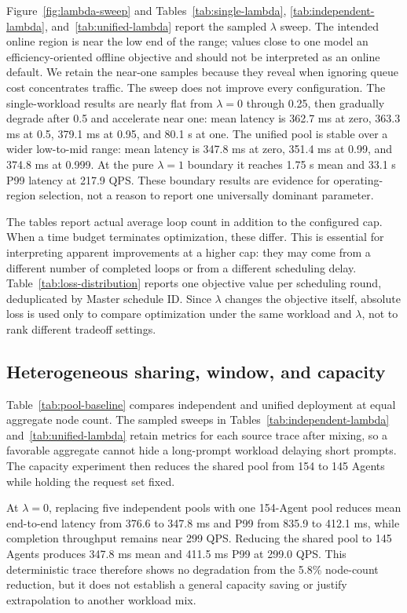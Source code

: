 \documentclass[10pt]{article}
\begin{document}
Figure~\ref{fig:lambda-sweep} and Tables~\ref{tab:single-lambda},
\ref{tab:independent-lambda}, and~\ref{tab:unified-lambda} report the sampled
$\lambda$ sweep. The intended online region is near the low end of the range;
values close to one model an efficiency-oriented offline objective and should
not be interpreted as an online default. We retain the near-one samples
because they reveal when ignoring queue cost concentrates traffic.
The sweep does not improve every configuration. The single-workload results
are nearly flat from $\lambda=0$ through 0.25, then gradually degrade after
0.5 and accelerate near one: mean latency is 362.7 ms at zero, 363.3 ms at
0.5, 379.1 ms at 0.95, and 80.1 s at one. The unified pool is stable over a
wider low-to-mid range: mean latency is 347.8 ms at zero, 351.4 ms at 0.99,
and 374.8 ms at 0.999. At the pure $\lambda=1$ boundary it reaches 1.75 s mean
and 33.1 s P99 latency at 217.9 QPS. These boundary results are evidence for
operating-region selection, not a reason to report one universally dominant
parameter.

The tables report actual average loop count in addition to the configured cap.
When a time budget terminates optimization, these differ. This is essential
for interpreting apparent improvements at a higher cap: they may come from a
different number of completed loops or from a different scheduling delay.
Table~\ref{tab:loss-distribution} reports one objective value per scheduling
round, deduplicated by Master schedule ID. Since $\lambda$ changes the
objective itself, absolute loss is used only to compare optimization under the
same workload and $\lambda$, not to rank different tradeoff settings.

\subsection{Heterogeneous sharing, window, and capacity}

Table~\ref{tab:pool-baseline} compares independent and unified deployment at
equal aggregate node count. The sampled sweeps in
Tables~\ref{tab:independent-lambda} and~\ref{tab:unified-lambda} retain metrics
for each source trace after mixing, so a favorable aggregate cannot hide a
long-prompt workload delaying short prompts. The capacity experiment then
reduces the shared pool from 154 to 145 Agents while holding the request set
fixed.

At $\lambda=0$, replacing five independent pools with one 154-Agent pool
reduces mean end-to-end latency from 376.6 to 347.8 ms and P99 from 835.9 to
412.1 ms, while completion throughput remains near 299 QPS. Reducing the
shared pool to 145 Agents produces 347.8 ms mean and 411.5 ms P99 at 299.0
QPS. This deterministic trace therefore shows no degradation from the 5.8\%
node-count reduction, but it does not establish a general capacity saving or
justify extrapolation to another workload mix.
\end{document}
